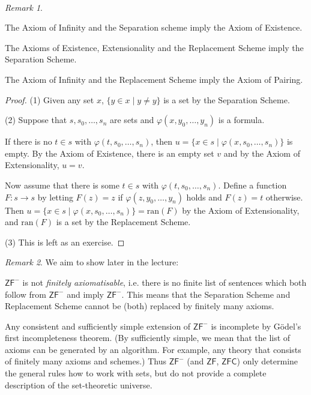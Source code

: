\documentclass[a4paper, 11pt]{amsart}
\theoremstyle{remark}
\newtheorem{remark}[remark]{Remark}
\newcommand{\axiomft}[1]{\mathsf{#1}}
\newcommand{\ZFC}{\axiomft{ZFC}}
\newcommand{\ZF}{\axiomft{ZF}}
\newcommand{\ran}{\mathrm{ran}}
\newenvironment{enumerate-(1)}{\begin{enumerate}[label={\upshape (\arabic*)}, leftmargin=2pc]}{\end{enumerate}}
\begin{document}
\ \\ 
\begin{remark} \ 
\begin{enumerate-(1)}
\item 
The Axiom of Infinity and the Separation scheme imply the Axiom of Existence. 
\item 
The Axioms of Existence, Extensionality and the Replacement Scheme imply the Separation Scheme. 
\item 
The Axiom of Infinity and the Replacement Scheme imply the Axiom of Pairing. 
\end{enumerate-(1)}
\end{remark} 
\begin{proof} 
(1) 
Given any set $x$, $\{y\in x \mid y\neq y\}$ is a set by the Separation Scheme. 

(2)
Suppose that $s, s_0,\dots,s_n$ are sets and $\varphi(x,y_0,\dots,y_n)$ is a formula. 

If there is no $t\in s$ with $\varphi(t,s_0,\dots,s_n)$, then $u=\{ x\in s \mid \varphi(x,s_0,\dots,s_n) \}$ is empty. 
By the Axiom of Existence, there is an empty set $v$ and by the Axiom of Extensionality, $u=v$. 

Now assume that there is some $t\in s$ with $\varphi(t,s_0,\dots,s_n)$. 
Define a function $F\colon s\rightarrow s$ by letting $F(z)=z$ if $\varphi(z,y_0,\dots,y_n)$ holds and $F(z)=t$ otherwise. 
Then $u=\{ x\in s \mid \varphi(x,s_0,\dots,s_n) \}= \ran(F)$ by the Axiom of Extensionality, and $\ran(F)$ is a set by the Replacement Scheme. 

(3) 
This is left as an exercise. 
\end{proof} 

\begin{remark} 
We aim to show later in the lecture: 
\begin{enumerate-(1)}
\item 
$\ZF^-$ is not \emph{finitely axiomatisable}, i.e. there is no finite list of sentences which both follow from $\ZF^-$ and imply $\ZF^-$. 
This means that the Separation Scheme and Replacement Scheme cannot be (both) replaced by finitely many axioms. 
\item 
Any consistent and sufficiently simple extension of $\ZF^-$ is incomplete by G\"odel's first incompleteness theorem. 
(By sufficiently simple, we mean that the list of axioms can be generated by an algorithm. For example, any theory that consists of finitely many axioms and schemes.) 
Thus $\ZF^-$ (and $\ZF$, $\ZFC$) only determine the general rules how to work with sets, but do not provide a complete description of the set-theoretic universe. 
\end{enumerate-(1)}
\end{remark} 
\end{document}

